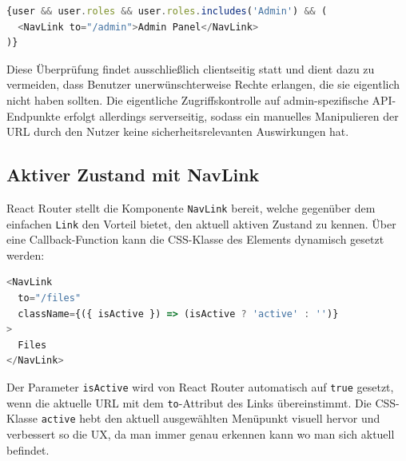 \begin{lstlisting}[language=JavaScript, caption={Rollenbasierte Anzeige des Admin-Menüpunkts}]
{user && user.roles && user.roles.includes('Admin') && (
  <NavLink to="/admin">Admin Panel</NavLink>
)}
\end{lstlisting}

Diese Überprüfung findet ausschließlich clientseitig statt und dient dazu zu vermeiden, dass Benutzer unerwünschterweise Rechte erlangen, die sie eigentlich nicht haben sollten. Die eigentliche Zugriffskontrolle auf admin-spezifische API-Endpunkte erfolgt allerdings serverseitig, sodass ein manuelles Manipulieren der URL durch den Nutzer keine sicherheitsrelevanten Auswirkungen hat.

\subsection{Aktiver Zustand mit NavLink}

React Router stellt die Komponente \texttt{NavLink} bereit, welche gegenüber dem einfachen \texttt{Link} den Vorteil bietet, den aktuell aktiven Zustand zu kennen. Über eine Callback-Function kann die CSS-Klasse des Elements dynamisch gesetzt werden:

\begin{lstlisting}[language=JavaScript, caption={Dynamische CSS-Klasse bei aktivem Navigationselement}]
<NavLink
  to="/files"
  className={({ isActive }) => (isActive ? 'active' : '')}
>
  Files
</NavLink>
\end{lstlisting}

Der Parameter \texttt{isActive} wird von React Router automatisch auf \texttt{true} gesetzt, wenn die aktuelle URL mit dem \texttt{to}-Attribut des Links übereinstimmt. Die CSS-Klasse \texttt{active} hebt den aktuell ausgewählten Menüpunkt visuell hervor und verbessert so die UX, da man immer genau erkennen kann wo man sich aktuell befindet.
